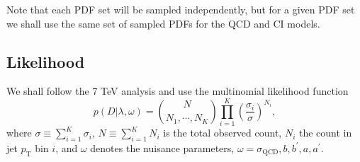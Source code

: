 \documentclass[aps,prd,preprint,nofootinbib]{revtex4}
\begin{document}
Note that each PDF set will be sampled independently, but for a
given PDF set we shall use the same set of sampled PDFs for the QCD and CI models.

%
\subsection{Likelihood}

We shall follow the 7 TeV analysis and use the  multinomial likelihood function
\begin{equation}
p(D|\lambda, \omega) = \binom{N}{N_1,\cdots,N_K} \prod_{i=1}^K \left(\frac{\sigma_i}{\sigma}\right)^{N_i},
\label{eq:like}
\end{equation}
where $\sigma \equiv \sum_{i=1}^K \sigma_i$,
$N \equiv \sum_{i=1}^K N_i$ is the total observed count, $N_i$ the count in jet $p_\text{T}$ bin $i$, and $\omega$ denotes the nuisance
parameters, $\omega = \sigma_\text{QCD}, b, b^\prime, a, a^\prime$.
\end{document}
